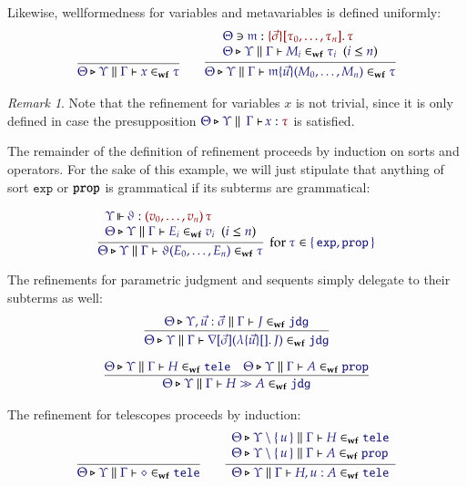 \documentclass[11pt]{article}
\theoremstyle{definition}
\theoremstyle{remark}
\newtheorem{remark}[thm]{Remark}
\numberwithin{equation}{section}
\newcommand\SortExp{\mathtt{exp}}
\newcommand\IsWf[5]{%
  \IMode{#1}\triangleright%
  \IMode{#2}\parallel%
  \IMode{#3}\vdash%
  \IMode{#4}\in_{\mathbf{wf}}\IMode{#5}%
}
\begin{document}
Likewise, wellformedness for variables and metavariables is defined uniformly:
\begin{gather*}
  \infer{
    \IsWf{\Theta}{\Upsilon}{\Gamma}{x}{\tau}
  }{
  }
\qquad
  \infer{
    \IsWf{\Theta}{\Upsilon}{\Gamma}{
      \MApp{\MV{m}}{\vec{u}}{M_0,\dots,M_n}
    }{\tau}
  }{
    \begin{array}{l}
      \Lookup{\Theta}{\MV{m}}{\MkValence{\vec{\sigma}}{\tau_0,\dots,\tau_n}{\tau}}
\\
      \HypJ{
        \IsWf{\Theta}{\Upsilon}{\Gamma}{M_i}{\tau_i}
      }{
        \Leq{i}{n}
      }
    \end{array}
  }
\end{gather*}

\begin{remark}
  Note that the refinement for variables $x$ is not trivial, since it is only
  defined in case the presupposition $\IsAbt{\Theta}{\Upsilon}{\Gamma}{x}{\tau}$
  is satisfied.
\end{remark}

The remainder of the definition of refinement proceeds by induction on sorts and
operators. For the sake of this example, we will just stipulate that anything of
sort $\SortExp$ or $\mathtt{prop}$ is grammatical if its subterms are grammatical:

\[
  \infer[
    \text{for $\Member{\tau}{\MkSet{\SortExp,\SortProp}}$}
  ]{
    \IsWf{\Theta}{\Upsilon}{\Gamma}{
      \App{\vartheta}{E_0,\dots,E_n}
    }{\tau}
  }{
    \begin{array}{l}
      \IsOperator{\Upsilon}{\vartheta}{
        \MkArity{
          v_0,\dots,v_n
        }{\tau}
      }
\\
      \HypJ{
        \IsWf{\Theta}{\Upsilon}{\Gamma}{E_i}{v_i}
      }{
        \Leq{i}{n}
      }
    \end{array}
  }
\]

The refinements for parametric judgment and sequents simply delegate to their
subterms as well:
\begin{gather*}
  \infer{
    \IsWf{\Theta}{\Upsilon}{\Gamma}{
      \App{\OpNabla{\vec{\sigma}}}{
        \MkBTm{\vec{u}}{}{J}
      }
    }{\SortJdg}
  }{
    \IsWf{\Theta}{\Upsilon,\vec{u}:\vec{\sigma}}{\Gamma}{J}{\SortJdg}
  }
\\[6pt]
  \infer{
    \IsWf{\Theta}{\Upsilon}{\Gamma}{
      H\gg A
    }{\SortJdg}
  }{
    \IsWf{\Theta}{\Upsilon}{\Gamma}{H}{\SortTele}
&
    \IsWf{\Theta}{\Upsilon}{\Gamma}{A}{\SortProp}
  }
\end{gather*}

The refinement for telescopes proceeds by induction:
\begin{gather*}
  \infer{
    \IsWf{\Theta}{\Upsilon}{\Gamma}{\diamond}{\SortTele}
  }{
  }
\qquad
  \infer{
    \IsWf{\Theta}{\Upsilon}{\Gamma}{H,u:A}{\SortTele}
  }{
    \begin{array}{l}
      \IsWf{\Theta}{\Upsilon\setminus\MkSet{u}}{\Gamma}{H}{\SortTele}
\\
      \IsWf{\Theta}{\Upsilon\setminus\MkSet{u}}{\Gamma}{A}{\SortProp}
    \end{array}
  }
\end{gather*}

\ifdraft{}{
  \nocite{*}
  
  
}
\end{document}
